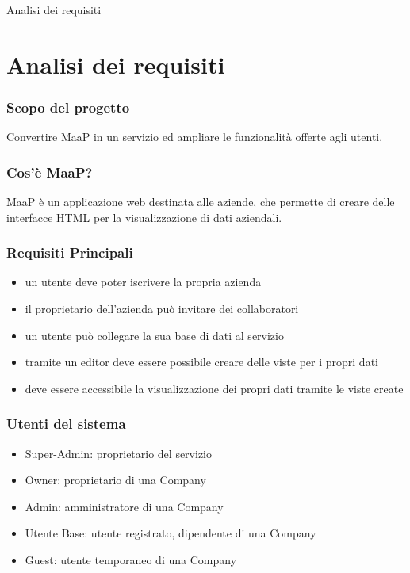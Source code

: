 \begin{frame}

\begin{center}
    \huge Analisi dei requisiti
\end{center}

\end{frame}

\section{Analisi dei requisiti}
\begin{frame}
  \frametitle{Scopo del progetto}

  \begin{center}
    Convertire MaaP in un servizio ed ampliare le funzionalità offerte agli utenti.
  \end{center}
\end{frame}

\begin{frame}
  \frametitle{Cos'è MaaP?}

  MaaP è un applicazione web destinata alle aziende, che permette di creare delle interfacce HTML per la visualizzazione di dati aziendali.

\end{frame}

\begin{frame}
  \frametitle{Requisiti Principali}

  \begin{itemize}
  \item un utente deve poter iscrivere la propria azienda
  \item il proprietario dell'azienda può invitare dei collaboratori
  \item un utente può collegare la sua base di dati al servizio
  \item tramite un editor deve essere possibile creare delle viste per i propri dati
  \item deve essere accessibile la visualizzazione dei propri dati tramite le viste create
  \end{itemize}
\end{frame}


\begin{frame}
  \frametitle{Utenti del sistema}

  \begin{itemize}
  \item Super-Admin: proprietario del servizio
  \item Owner: proprietario di una Company
  \item Admin: amministratore di una Company
  \item Utente Base: utente registrato, dipendente di una Company
  \item Guest: utente temporaneo di una Company
  \end{itemize}

\end{frame}


